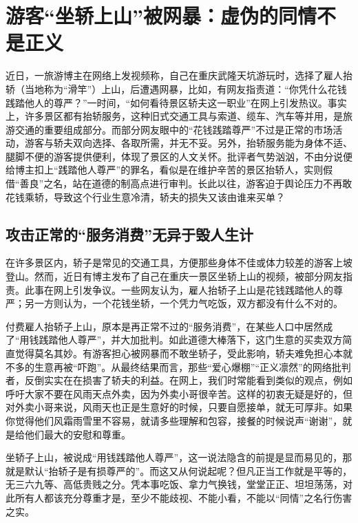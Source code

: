 
\section*{游客“坐轿上山”被网暴：虚伪的同情不是正义}


近日，一旅游博主在网络上发视频称，自己在重庆武隆天坑游玩时，选择了雇人抬轿（当地称为“滑竿”）上山，后遭遇网暴，比如，有网友指责道：“你凭什么花钱践踏他人的尊严？”一时间，“如何看待景区轿夫这一职业”在网上引发热议。事实上，许多景区都有抬轿服务，这种旧式交通工具与索道、缆车、汽车等并用，是旅游交通的重要组成部分。而部分网友眼中的“花钱践踏尊严”不过是正常的市场活动，游客与轿夫双向选择、各取所需，并无不妥。另外，抬轿服务能为身体不适、腿脚不便的游客提供便利，体现了景区的人文关怀。批评者气势汹汹，不由分说便给博主扣上“践踏他人尊严”的罪名，看似是在维护辛苦的景区抬轿人，实则假借“善良”之名，站在道德的制高点进行审判。长此以往，游客迫于舆论压力不再敢花钱乘轿，导致这个行业生意冷清，轿夫的损失又该由谁来买单？

\subsection*{攻击正常的“服务消费”无异于毁人生计}

在许多景区内，轿子是常见的交通工具，方便那些身体不佳或体力较差的游客上坡登山。然而，近日有博主发布了自己在重庆一景区坐轿上山的视频，被部分网友指责。此事在网上引发争议。一些网友认为，雇人抬轿子上山是花钱践踏他人的尊严；另一方则认为，一个花钱坐轿，一个凭力气吃饭，双方都没有什么不对的。

付费雇人抬轿子上山，原本是再正常不过的“服务消费”，在某些人口中居然成了“用钱践踏他人尊严”，并大加批判。如此道德大棒落下，这门生意的买卖双方简直觉得莫名其妙。有游客担心被网暴而不敢坐轿子，受此影响，轿夫难免担心本就不多的生意再被“吓跑”。从最终结果而言，那些“爱心爆棚”“正义凛然”的网络批判者，反倒实实在在损害了轿夫的利益。在网上，我们时常能看到类似的观点，例如呼吁大家不要在风雨天点外卖，因为外卖小哥很辛苦。这样的初衷无疑是好的，但对外卖小哥来说，风雨天也正是生意好的时候，只要自愿接单，就无可厚非。如果你觉得他们风霜雨雪里不容易，就请多些理解和包容，接餐的时候说声“谢谢”，就是给他们最大的安慰和尊重。

坐轿子上山，被说成“用钱践踏他人尊严”，这一说法隐含的前提是显而易见的，那就是默认“抬轿子是有损尊严的”。而这又从何说起呢？但凡正当工作就是平等的，无三六九等、高低贵贱之分。凭本事吃饭、拿力气换钱，堂堂正正、坦坦荡荡，对此所有人都该充分尊重才是，至少不能歧视、不能小看，不能以“同情”之名行伤害之实。

